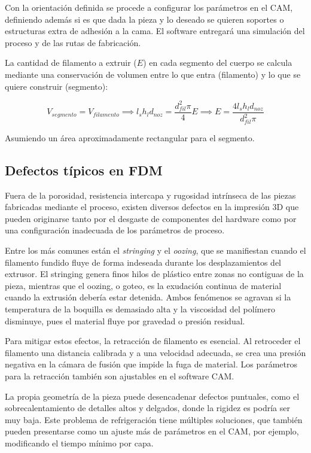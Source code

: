 Con la orientación definida se procede a configurar los parámetros en el CAM, definiendo además si es que dada la pieza y lo deseado se quieren soportes o estructuras extra de adhesión a la cama. El software entregará una simulación del proceso y de las rutas de fabricación. 

La cantidad de filamento a extruir ($E$) en cada segmento del cuerpo se calcula mediante una conservación de volumen entre lo que entra (filamento) y lo que se quiere construir (segmento):

\begin{equation}
	V_{segmento}=V_{filamento}\implies l_{s}h_{l}d_{noz}=\frac{d_{fil}^{2}\pi}{4}E\implies E= \frac{4 l_{s}h_{l}d_{noz}}{d_{fil}^{2} \pi}
\end{equation}

Asumiendo un área aproximadamente rectangular para el segmento.

\subsection{Defectos típicos en FDM}

Fuera de la porosidad, resistencia intercapa y rugosidad intrínseca de las piezas fabricadas mediante el proceso, existen diversos defectos en la impresión 3D que pueden originarse tanto por el desgaste de componentes  del hardware como por una configuración inadecuada de los parámetros de proceso. 

Entre los más comunes están el \textit{stringing} y el \textit{oozing}, que se manifiestan cuando el filamento fundido fluye de forma indeseada durante los desplazamientos del extrusor. El stringing genera finos hilos de plástico entre zonas no contiguas de la pieza, mientras que el oozing, o goteo, es la exudación continua de material cuando la extrusión debería estar detenida. Ambos fenómenos se agravan si la temperatura de la boquilla es demasiado alta y la viscosidad del polímero disminuye, pues el material fluye por gravedad o presión residual.

Para mitigar estos efectos, la retracción de filamento es esencial. Al retroceder el filamento una distancia calibrada y a una velocidad adecuada, se crea una presión negativa en la cámara de fusión que impide la fuga de material. Los parámetros para la retracción también son ajustables en el software CAM.

La propia geometría de la pieza puede desencadenar defectos puntuales, como el sobrecalentamiento de detalles altos y delgados, donde la rigidez es podría ser muy baja. Este problema de refrigeración tiene múltiples soluciones, que también pueden presentarse como un ajuste más de parámetros en el CAM, por ejemplo, modificando el tiempo mínimo por capa.

